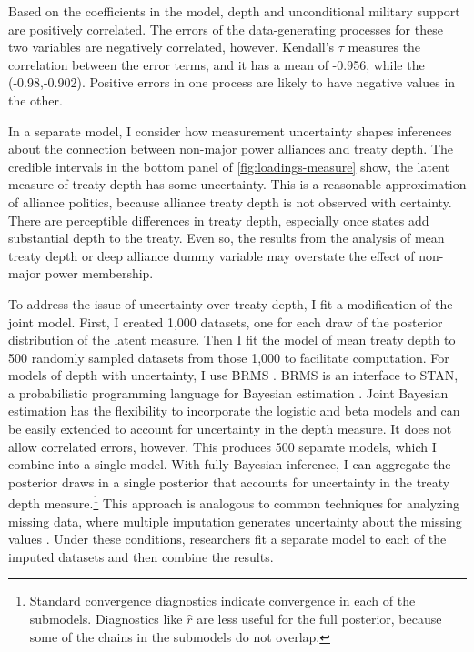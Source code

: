 \documentclass[12pt]{article}
\begin{document}
Based on the coefficients in the model, depth and unconditional military support are positively correlated. 
The errors of the data-generating processes for these two variables are negatively correlated, however. 
Kendall's $\tau$ measures the correlation between the error terms, and it has a mean of -0.956, while the (-0.98,-0.902).
Positive errors in one process are likely to have negative values in the other. 

 
In a separate model, I consider how measurement uncertainty shapes inferences about the connection between non-major power alliances and treaty depth. 
The credible intervals in the bottom panel of \autoref{fig:loadings-measure} show, the latent measure of treaty depth has some uncertainty. 
This is a reasonable approximation of alliance politics, because alliance treaty depth is not observed with certainty. 
There are perceptible differences in treaty depth, especially once states add substantial depth to the treaty. 
Even so, the results from the analysis of mean treaty depth or deep alliance dummy variable may overstate the effect of non-major power membership. 


To address the issue of uncertainty over treaty depth, I fit a modification of the joint model. 
First, I created 1,000 datasets, one for each draw of the posterior distribution of the latent measure.
Then I fit the model of mean treaty depth to 500 randomly sampled datasets from those 1,000 to facilitate computation. 
For models of depth with uncertainty, I use BRMS \citep{Buerkner2017}. 
BRMS is an interface to STAN, a probabilistic programming language for Bayesian estimation \citep{Carpenteretal2016}. 
Joint Bayesian estimation has the flexibility to incorporate the logistic and beta models and can be easily extended to account for uncertainty in the depth measure. 
It does not allow correlated errors, however.
This produces 500 separate models, which I combine into a single model. 
With fully Bayesian inference, I can aggregate the posterior draws in a single posterior that accounts for uncertainty in the treaty depth measure.\footnote{Standard convergence diagnostics indicate convergence in each of the submodels. Diagnostics like $\hat{r}$ are less useful for the full posterior, because some of the chains in the submodels do not overlap.}
This approach is analogous to common techniques for analyzing missing data, where multiple imputation generates uncertainty about the missing values \citep{Hollenbachetal2018imp}.
Under these conditions, researchers fit a separate model to each of the imputed datasets and then combine the results. 
\end{document}
